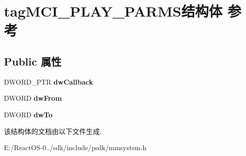 \hypertarget{structtag_m_c_i___p_l_a_y___p_a_r_m_s}{}\section{tag\+M\+C\+I\+\_\+\+P\+L\+A\+Y\+\_\+\+P\+A\+R\+M\+S结构体 参考}
\label{structtag_m_c_i___p_l_a_y___p_a_r_m_s}
\subsection*{Public 属性}
\begin{DoxyCompactItemize}
\item 
\mbox{\label{structtag_m_c_i___p_l_a_y___p_a_r_m_s_a56f14e198048f0a49151318f0f6ca5da}} 
D\+W\+O\+R\+D\+\_\+\+P\+TR {\bfseries dw\+Callback}
\item 
\mbox{\label{structtag_m_c_i___p_l_a_y___p_a_r_m_s_a2633105f37f042792a712fa703fe05cc}} 
D\+W\+O\+RD {\bfseries dw\+From}
\item 
\mbox{\label{structtag_m_c_i___p_l_a_y___p_a_r_m_s_ae726a7df1a159a8ff11478e5637beb01}} 
D\+W\+O\+RD {\bfseries dw\+To}
\end{DoxyCompactItemize}


该结构体的文档由以下文件生成\+:\begin{DoxyCompactItemize}
\item 
E\+:/\+React\+O\+S-\/0../sdk/include/psdk/mmsystem.\+h\end{DoxyCompactItemize}
